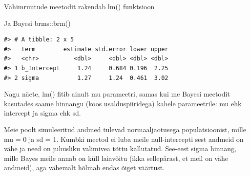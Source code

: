\documentclass[]{book}
\newenvironment{Shaded}{\begin{snugshade}}{\end{snugshade}}
\newcommand{\KeywordTok}[1]{\textcolor[rgb]{0.13,0.29,0.53}{\textbf{#1}}}
\newcommand{\DataTypeTok}[1]{\textcolor[rgb]{0.13,0.29,0.53}{#1}}
\newcommand{\DecValTok}[1]{\textcolor[rgb]{0.00,0.00,0.81}{#1}}
\newcommand{\StringTok}[1]{\textcolor[rgb]{0.31,0.60,0.02}{#1}}
\newcommand{\CommentTok}[1]{\textcolor[rgb]{0.56,0.35,0.01}{\textit{#1}}}
\newcommand{\OperatorTok}[1]{\textcolor[rgb]{0.81,0.36,0.00}{\textbf{#1}}}
\newcommand{\NormalTok}[1]{#1}
\begin{document}
\begin{Shaded}
\end{Shaded}

Vähimruutude meetodit rakendab lm() funktsioon

\begin{Shaded}
\end{Shaded}

Ja Bayesi brms::brm()

\begin{Shaded}
\end{Shaded}

\begin{verbatim}
#> # A tibble: 2 x 5
#>   term        estimate std.error lower upper
#>   <chr>          <dbl>     <dbl> <dbl> <dbl>
#> 1 b_Intercept     1.24     0.684 0.196  2.25
#> 2 sigma           1.27     1.24  0.461  3.02
\end{verbatim}

Nagu näete, lm() fitib ainult mu parameetri, samas kui me Bayesi
meetodit kasutades saame hinnangu (koos usalduspiiridega) kahele
parameetrile: mu ehk intercept ja sigma ehk sd.

Meie poolt simuleeritud andmed tulevad normaaljaotusega populatsioonist,
mille mu = 0 ja sd = 1. Kumbki meetod ei luba meile null-intercepti sest
andmeid on vähe ja need on juhusliku valimivea tõttu kallutatud.
See-eest sigma hinnang, mille Bayes meile annab on küll laiavõitu (ikka
sellepärast, et meil on vähe andmeid), aga vähemalt hõlmab endas õiget
väärtust.
\end{document}
